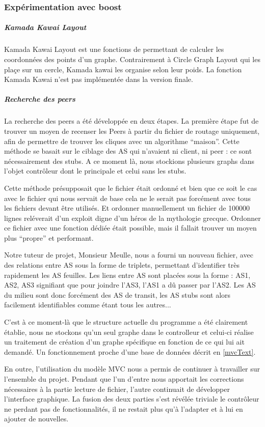 \subsubsection{Expérimentation avec boost}

\subparagraph{Kamada Kawai Layout\\}
Kamada Kawai Layout est une fonctions de \boost permettant de calculer les coordonn\'ees des points d'un graphe. Contrairement \`a Circle Graph Layout qui les pla\c ce sur un cercle, Kamada kawai les organise selon leur poids.
La fonction Kamada Kawai n'est pas impl\'ement\'ee dans la version finale.

\subparagraph{Recherche des peers\\}
La recherche des peers a été développée en deux étapes. La première étape fut de trouver un moyen de recenser les Peers à partir du fichier de routage uniquement, afin de permettre de trouver les cliques avec un algorithme ``maison''. Cette méthode se basait sur le ciblage des AS qui n'avaient ni client, ni peer : ce sont n\'ecessairement des stubs. A ce moment là, nous stockions plusieurs graphs dans l'objet contrôleur dont le principale et celui sans les stubs.

Cette méthode présupposait que le fichier était ordonné et bien que ce soit le cas avec le fichier qui nous servait de base cela ne le serait pas forcément avec tous les fichiers devant être utilisés. Et ordonner manuellement un fichier de 100000 lignes reléverait d'un exploit digne d'un héros de la mythologie grecque. Ordonner ce fichier avec une fonction dédiée était possible, mais il fallait trouver un moyen plus ``propre'' et performant.

\par Notre tuteur de projet, Monsieur Meulle, nous a fourni un nouveau fichier, avec des relations entre AS sous la forme de triplets, permettant d'identifier tr\`es rapidement les AS feuilles.
Les liens entre AS sont plac\'ees sous la forme : {AS1, AS2, AS3} signifiant que pour joindre l'AS3, l'AS1 a dû passer par l'AS2. Les AS du milieu sont donc forcément des AS de transit, les AS stubs sont alors facilement identifiables comme \'etant tous les autres... 

C'est à ce moment-là que le structure actuelle du programme a été clairement établie, nous ne stockons qu'un seul graphe dans le controlleur et celui-ci réalise un traitement de création d'un graphe spécifique en fonction de ce qui lui ait demandé. Un fonctionnement proche d'une base de données décrit en \ref{mvcText}. 

En outre, l'utilisation du modèle MVC nous a permis de continuer à travailler sur l'ensemble du projet. Pendant que l'un d'entre nous apportait les corrections nécessaires à la partie lecture de fichier, l'autre continuait de développer l'interface graphique. La fusion des deux parties s'est révélée triviale le contrôleur ne perdant pas de fonctionnalités, il ne restait plus qu'à l'adapter et à lui en ajouter de nouvelles.
